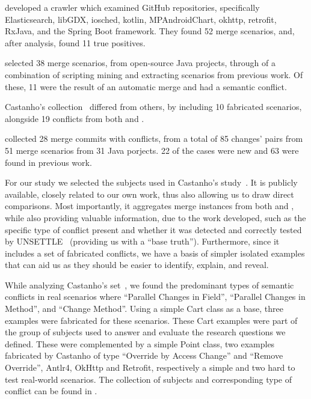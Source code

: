 \citet{kn:safemerge} developed a crawler which examined GitHub repositories, specifically Elasticsearch, libGDX, iosched, kotlin, MPAndroidChart, okhttp, retrofit, RxJava, and the Spring Boot framework. They found 52 merge scenarios,
and, after analysis, found 11 true positives.

\citet{kn:leuson} selected 38 merge scenarios, from open-source Java projects, through of a combination of scripting mining and extracting scenarios from previous work. Of these, 11 were the result of an automatic merge and had a semantic conflict.

Castanho's collection~\cite{kn:nuno} differed from others, by including 10 fabricated scenarios, alongside 19 conflicts from both \citet{kn:safemerge} and \citet{kn:leuson}.

\citet{kn:leuson2} collected 28 merge commits with conflicts, from a total of 85 changes' pairs from 51 merge scenarios from 31 Java porjects. 22 of the cases were new and 63 were found in previous work.

For our study we selected the subjects used in Castanho's study~\cite{kn:nuno}.  It is
publicly available, closely related to our own work, thus also allowing us to
draw direct comparisons.  Most importantly, it aggregates merge instances from
both \citet{kn:leuson} and \citet{kn:safemerge}, while also providing valuable
information, due to the work developed, such as the specific type of conflict
present and whether it was detected and correctly tested by UNSETTLE~\cite{kn:nuno}
(providing us with a ``base truth'').  Furthermore, since it includes a set of
fabricated conflicts, we have a basis of simpler isolated examples that can aid us as
they should be easier to identify, explain, and reveal.

While analyzing Castanho's set~\cite{kn:nuno}, we found the predominant types of semantic
conflicts in real scenarios where ``Parallel Changes in Field'', ``Parallel Changes in Method'',
and ``Change Method''.  Using a simple Cart class as a base, three examples were
fabricated for these scenarios.  These Cart examples were part of the group of subjects used to answer and evaluate the research questions we defined.  These were complemented by a simple Point class, two examples fabricated by Castanho of type ``Override by Access Change'' and ``Remove Override'', %
Antlr4, OkHttp and Retrofit, respectively a simple and two hard to test real-world scenarios.
The collection of subjects and corresponding type of conflict can be found in .

